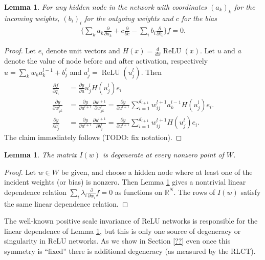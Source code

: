 \documentclass{article} %
\newtheorem{lemma}[theorem]{Lemma}
\begin{document}
\begin{lemma}\label{lemma:reln} For any hidden node in the network with coordinates $(a_k)_k$ for the incoming weights, $(b_i)_i$ for the outgoing weights and $c$ for the bias
\begin{align*}
\Big\{ \sum_k a_{k}\frac{\partial}{\partial a_k} + c \frac{\partial}{\partial c}-\sum_{i} b_i\frac{\partial}{\partial b_i} \Big\} f = 0.
\end{align*}
\end{lemma}
\begin{proof}
Let $e_i$ denote unit vectors and $H(x)=\frac{d}{dx}\operatorname{ReLU}(x)$. Let $u$ and $a$ denote the value of node before and after activation, respectively $u =\sum_k w_k a_{k}^{l-1}+b_{j}^{l}$ and $a_{j}^{l} =\operatorname{ReLU}(u_{j}^{l})$. Then
\begin{align*}
\frac{\partial f}{\partial q_i}&=\frac{\partial y}{\partial u}u_{j}^{l}H(u_{j}^{l})e_{i}\\
\frac{\partial y}{\partial w_{jk}^{l}}&=\frac{\partial y}{\partial u^{l+1}}\frac{\partial u^{l+1}}{\partial w_{jk}^{l}}=\frac{\partial y}{\partial u^{l+1}}\sum_{i=1}^{d_{l+1}}w_{ij}^{l+1}a_{k}^{l-1}H(u_{j}^{l})e_{i}.\\
\frac{\partial y}{\partial b_{j}^{l}}&=\frac{\partial y}{\partial u^{l+1}}\frac{\partial u^{l+1}}{\partial b_{j}^{l}}=\frac{\partial y}{\partial u^{l+1}}\sum_{i=1}^{d_{l+1}}w_{ij}^{l+1}H(u_{j}^{l})e_{i}.
\end{align*}
The claim immediately follows (TODO: fix notation).
\end{proof}

\begin{lemma} The matrix $I(w)$ is degenerate at every nonzero point of $W$.
\end{lemma}
\begin{proof}
Let $w \in W$ be given, and choose a hidden node where at least one of the incident weights (or bias) is nonzero. Then Lemma \ref{lemma:reln} gives a nontrivial linear dependence relation $\sum_i \lambda_i \frac{\partial}{\partial w_i} f = 0$ as functions on $\mathbb{R}^N$. The rows of $I(w)$ satisfy the same linear dependence relation.
\end{proof}

The well-known positive scale invariance of ReLU networks is responsible for the linear dependence of Lemma \ref{lemma:reln}, but this is only one source of degeneracy or singularity in ReLU networks. As we show in Section \ref{??} even once this symmetry is ``fixed'' there is additional degeneracy (as measured by the RLCT).
\end{document}
